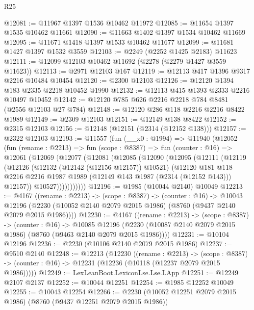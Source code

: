 \begin{lexlean}{R25}
\begin{coremodule}
@12081 := @11967 @1397 @1536 @10462 @11972
@12085 := @11654 @1397 @1535 @10462 @11661
@12090 := @11663 @1402 @1397 @1534 @10462 @11669
@12095 := @11671 @1418 @1397 @1533 @10462 @11677
@12099 := @11681 @1427 @1397 @1532 @3559
@12103 := @2249 (@2252 @1425 @2183) @11623
@12111 := @12099 @12103 @10462 @11692 (@2278 (@2279 @1427 @3559 @11623))
@12113 := @2971 @12103 @167
@12119 := @12113 @417 @1396 @9317 @2216 @10484 @10454
@12120 := @2300 @12103
@12126 := @12120 @1394 @183 @2335 @2218 @10452 @1990
@12132 := @12113 @415 @1393 @2333 @2216 @10497 @10452
@12142 := @12120 @785 @626 @2216 @2218 @784 @8481 (@2556 @12103 @27 @784)
@12148 := @12120 @286 @118 @2216 @2216 @8422 @1989
@12149 := @2309 @12103
@12151 := @12149 @138 @8422
@12152 := @2315 @12103
@12156 := @12148 (@12151 (@2314 (@12152 @138)))
@12157 := @2322 @12103
@12193 := @11557
    (fun (__x0 : @1994) =>
    @11940
      (@12052
        (fun (rename : @2213) =>
        fun (scope : @8387) =>
        fun (counter : @16) =>
        @12061
          (@12069
            (@12077
              (@12081
                (@12085
                  (@12090
                    (@12095
                      (@12111
                        (@12119
                          (@12126
                            (@12132 (@12142 (@12156 @12157)) @10521)
                            (@12120
                              @181
                              @118
                              @2216
                              @2216
                              @1987
                              @1989
                              (@12149 @143 @1987 (@2314 (@12152 @143)))
                              @12157))
                          @10527)))))))))))
@12196 := @1985 (@10044 @2140) @10049
@12213 := @4167
    ((rename : @2213) ->
    (scope : @8387) ->
    (counter : @16) ->
    @10043 @12196 (@2230 (@10052 @2140 @2079 @2015 @1986) (@8760 (@9437 @2140 @2079 @2015 @1986))))
@12230 := @4167
    ((rename : @2213) ->
    (scope : @8387) ->
    (counter : @16) ->
    @10085 @12196 (@2230 (@10087 @2140 @2079 @2015 @1986) (@8760 (@9463 @2140 @2079 @2015 @1986))))
@12231 := @10104 @12196
@12236 := @2230 (@10106 @2140 @2079 @2015 @1986)
@12237 := @9510 @2140
@12248 := @12213
    (@12230
      ((rename : @2213) ->
      (scope : @8387) -> (counter : @16) -> @12231 (@12236 (@10118 (@12237 @2079 @2015 @1986)))))
@12249 := LexLeanBoot.LexiconLse.Lse.LApp
@12251 := @12249 @2107 @2137
@12252 := @10044 @12251
@12254 := @1985 @12252 @10049
@12255 := @10043 @12254
@12266 := @2230 (@10052 @12251 @2079 @2015 @1986) (@8760 (@9437 @12251 @2079 @2015 @1986))

\end{coremodule}
\end{lexlean}
